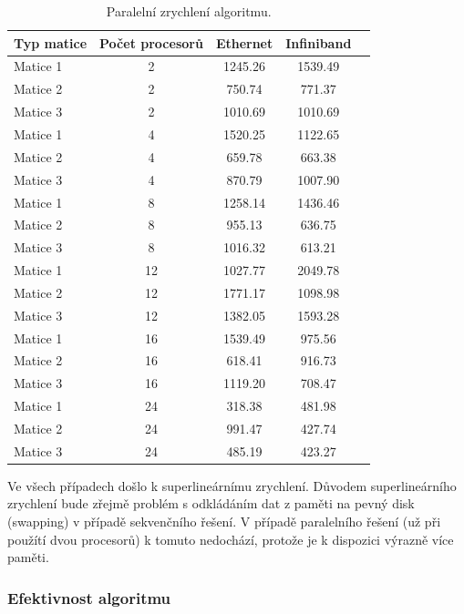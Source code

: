 \documentclass[12pt]{article}
\begin{document}
\begin{table}[ht]
\centering
\begin{tabular}{|l|c|c|c|c|}
\hline \textbf{Typ matice} & \textbf{Počet procesorů} & \textbf{Ethernet} & \textbf{Infiniband} \\
\hline 
\hline Matice 1 & 2 & 1245.26 & 1539.49 \\ 
\hline Matice 2 & 2 & 750.74 & 771.37 \\ 
\hline Matice 3 & 2 & 1010.69 & 1010.69 \\ 
\hline
\hline Matice 1 & 4 & 1520.25 & 1122.65 \\ 
\hline Matice 2 & 4 & 659.78 & 663.38 \\ 
\hline Matice 3 & 4 & 870.79 & 1007.90 \\ 
\hline 
\hline Matice 1 & 8 & 1258.14 & 1436.46 \\ 
\hline Matice 2 & 8 & 955.13 & 636.75 \\ 
\hline Matice 3 & 8 & 1016.32 & 613.21 \\ 
\hline 
\hline Matice 1 & 12 & 1027.77 & 2049.78 \\ 
\hline Matice 2 & 12 & 1771.17 & 1098.98 \\ 
\hline Matice 3 & 12 & 1382.05 & 1593.28 \\ 
\hline 
\hline Matice 1 & 16 & 1539.49 & 975.56 \\ 
\hline Matice 2 & 16 & 618.41 & 916.73 \\ 
\hline Matice 3 & 16 & 1119.20 & 708.47 \\ 
\hline 
\hline Matice 1 & 24 & 318.38 & 481.98 \\ 
\hline Matice 2 & 24 & 991.47 & 427.74 \\ 
\hline Matice 3 & 24 & 485.19 & 423.27 \\ 
\hline 
\end{tabular}
\caption{Paralelní zrychlení algoritmu.}
\label{paralelni_zrychleni}
\end{table}


Ve všech případech došlo k superlineárnímu zrychlení. Důvodem superlineárního zrychlení bude zřejmě problém s odkládáním dat z paměti na pevný disk (swapping) v případě sekvenčního řešení. V případě paralelního řešení (už při použítí dvou procesorů) k tomuto nedochází, protože je k dispozici výrazně více paměti.

\subsubsection{Efektivnost algoritmu}
\end{document}
